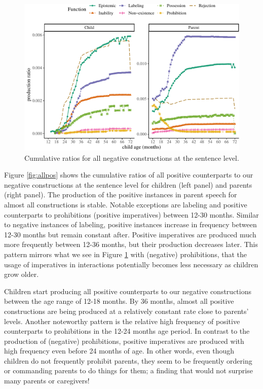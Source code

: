 \documentclass[
  man,floatsintext]{apa6}
\begin{document}
\begin{figure}[H]

{\centering \includegraphics{neg_construction_article_files/figure-latex/allneg-1} 

}

\caption{Cumulative ratios for all negative constructions at the sentence level.}\label{fig:allneg}
\end{figure}

Figure \ref{fig:allpos} shows the cumulative ratios of all positive counterparts to our negative constructions at the sentence level for children (left panel) and parents (right panel). The production of the positive instances in parent speech for almost all constructions is stable. Notable exceptions are labeling and positive counterparts to prohibitions (positive imperatives) between 12-30 months. Similar to negative instances of labeling, positive instances increase in frequency between 12-30 months but remain constant after. Positive imperatives are produced much more frequently between 12-36 months, but their production decreases later. This pattern mirrors what we see in Figure \ref{fig:allneg} with (negative) prohibitions, that the usage of imperatives in interactions potentially becomes less necessary as children grow older.

Children start producing all positive counterparts to our negative constructions between the age range of 12-18 months. By 36 months, almost all positive constructions are being produced at a relatively constant rate close to parents' levels. Another noteworthy pattern is the relative high frequency of positive counterparts to prohibitions in the 12-24 months age period. In contrast to the production of (negative) prohibitions, positive imperatives are produced with high frequency even before 24 months of age. In other words, even though children do not frequently prohibit parents, they seem to be frequently ordering or commanding parents to do things for them; a finding that would not surprise many parents or caregivers!
\end{document}
